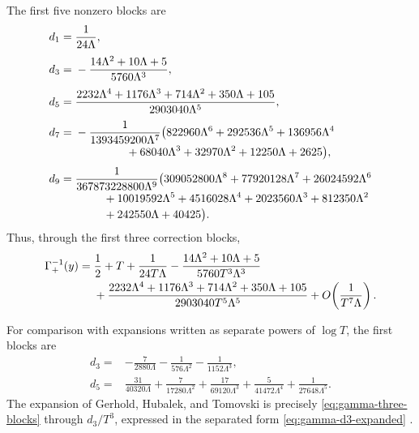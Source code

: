 \documentclass[11pt,oneside]{article}
\theoremstyle{plain}
\theoremstyle{definition}
\theoremstyle{remark}
\begin{document}
The first five nonzero blocks are
\begin{align}
 d_1={}&\frac{1}{24\Lambda},
 \label{eq:gamma-d1}\\[0.3em]
 d_3={}&-\frac{14\Lambda^2+10\Lambda+5}{5760\Lambda^3},
 \label{eq:gamma-d3}\\[0.3em]
 d_5={}&\frac{
 2232\Lambda^4+1176\Lambda^3+714\Lambda^2+350\Lambda+105}
 {2903040\Lambda^5},
 \label{eq:gamma-d5}\\[0.3em]
 d_7={}&-\frac{1}{1393459200\Lambda^7}
 \bigl(
 822960\Lambda^6+292536\Lambda^5+136956\Lambda^4
 \notag\\[-0.2em]
 &\hspace{4.5em}{}+68040\Lambda^3+32970\Lambda^2
 +12250\Lambda+2625
 \bigr),
 \label{eq:gamma-d7}\\[0.3em]
 d_9={}&\frac{1}{367873228800\Lambda^9}
 \bigl(
 309052800\Lambda^8+77920128\Lambda^7+26024592\Lambda^6
 \notag\\[-0.2em]
 &\hspace{2.5em}{}+10019592\Lambda^5+4516028\Lambda^4
 +2023560\Lambda^3+812350\Lambda^2
 \notag\\[-0.2em]
 &\hspace{2.5em}{}+242550\Lambda+40425
 \bigr).
 \label{eq:gamma-d9}
\end{align}
Thus, through the first three correction blocks,
\begin{align}
 \Gamma_+^{-1}(y)={}&\frac12+T
 +\frac{1}{24T\Lambda}
 -\frac{14\Lambda^2+10\Lambda+5}{5760T^3\Lambda^3}
 \notag\\
 &+\frac{2232\Lambda^4+1176\Lambda^3+714\Lambda^2
 +350\Lambda+105}{2903040T^5\Lambda^5}
 +O\!\left(\frac{1}{T^7\Lambda}\right).
 \label{eq:gamma-three-blocks}
\end{align}

For comparison with expansions written as separate powers of \(\log T\), the
first blocks are
\begin{align}
 d_3={}&-\frac{7}{2880\Lambda}
        -\frac{1}{576\Lambda^2}
        -\frac{1}{1152\Lambda^3},
 \label{eq:gamma-d3-expanded}\\
 d_5={}&\frac{31}{40320\Lambda}
 +\frac{7}{17280\Lambda^2}
 +\frac{17}{69120\Lambda^3}
 +\frac{5}{41472\Lambda^4}
 +\frac{1}{27648\Lambda^5}.
 \label{eq:gamma-d5-expanded}
\end{align}
The expansion of Gerhold, Hubalek, and Tomovski is precisely
\cref{eq:gamma-three-blocks} through \(d_3/T^3\), expressed in the separated
form \cref{eq:gamma-d3-expanded} \cite{GerholdHubalekTomovski}.
\end{document}
